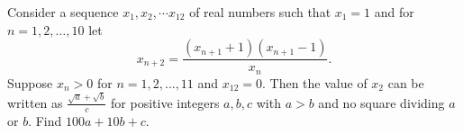 Consider a sequence $x_1,x_2,\cdots x_{12}$ of real numbers such that $x_1=1$ and for $n=1,2,\dots,10$ let \[ x_{n+2}=\frac{(x_{n+1}+1)(x_{n+1}-1)}{x_n}. \] Suppose $x_n>0$ for $n=1,2,\dots,11$ and $x_{12}=0$. Then the value of $x_2$ can be written as $\frac{\sqrt{a}+\sqrt{b}}{c}$ for positive integers $a,b,c$ with $a>b$ and no square dividing $a$ or $b$. Find $100a+10b+c$.
